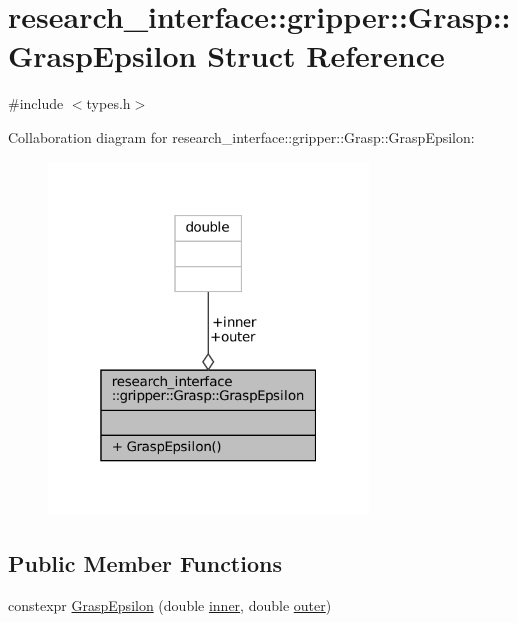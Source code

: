 \hypertarget{structresearch__interface_1_1gripper_1_1Grasp_1_1GraspEpsilon}{}\section{research\+\_\+interface\+:\+:gripper\+:\+:Grasp\+:\+:Grasp\+Epsilon Struct Reference}
\label{structresearch__interface_1_1gripper_1_1Grasp_1_1GraspEpsilon}


{\ttfamily \#include $<$types.\+h$>$}



Collaboration diagram for research\+\_\+interface\+:\+:gripper\+:\+:Grasp\+:\+:Grasp\+Epsilon\+:
\nopagebreak
\begin{figure}[H]
\begin{center}
\leavevmode
\includegraphics[width=241pt]{structresearch__interface_1_1gripper_1_1Grasp_1_1GraspEpsilon__coll__graph}
\end{center}
\end{figure}
\subsection*{Public Member Functions}
\begin{DoxyCompactItemize}
\item 
constexpr \hyperlink{structresearch__interface_1_1gripper_1_1Grasp_1_1GraspEpsilon_a2823c4e98498051b60afab638b679778}{Grasp\+Epsilon} (double \hyperlink{structresearch__interface_1_1gripper_1_1Grasp_1_1GraspEpsilon_a380022de09288513e27ee07b3779ebec}{inner}, double \hyperlink{structresearch__interface_1_1gripper_1_1Grasp_1_1GraspEpsilon_a9d00f5f20a740391ce1c622b0c93fcf3}{outer})
\end{DoxyCompactItemize}
